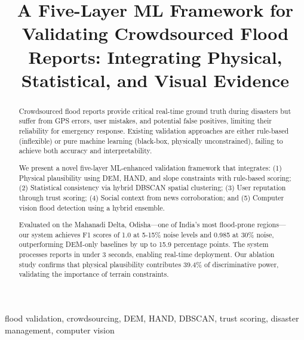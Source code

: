 \documentclass[conference]{IEEEtran}
\begin{document}
\title{A Five-Layer ML Framework for Validating Crowdsourced Flood Reports: Integrating Physical, Statistical, and Visual Evidence}

\author{
}

\maketitle

\begin{abstract}
Crowdsourced flood reports provide critical real-time ground truth during disasters but suffer from GPS errors, user mistakes, and potential false positives, limiting their reliability for emergency response. Existing validation approaches are either rule-based (inflexible) or pure machine learning (black-box, physically unconstrained), failing to achieve both accuracy and interpretability.

We present a novel five-layer ML-enhanced validation framework that integrates: (1) Physical plausibility using DEM, HAND, and slope constraints with rule-based scoring; (2) Statistical consistency via hybrid DBSCAN spatial clustering; (3) User reputation through trust scoring; (4) Social context from news corroboration; and (5) Computer vision flood detection using a hybrid ensemble.

Evaluated on the Mahanadi Delta, Odisha---one of India's most flood-prone regions---our system achieves F1 scores of 1.0 at 5-15\% noise levels and 0.985 at 30\% noise, outperforming DEM-only baselines by up to 15.9 percentage points. The system processes reports in under 3 seconds, enabling real-time deployment. Our ablation study confirms that physical plausibility contributes 39.4\% of discriminative power, validating the importance of terrain constraints.
\end{abstract}

\begin{IEEEkeywords}
flood validation, crowdsourcing, DEM, HAND, DBSCAN, trust scoring, disaster management, computer vision
\end{IEEEkeywords}
\end{document}
